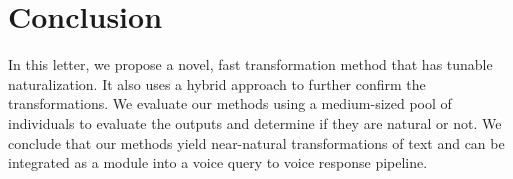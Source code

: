 \documentclass[journal]{IEEEtran}
\begin{document}
\section{Conclusion}

In this letter, we propose a novel, fast transformation method that has tunable naturalization. It also uses a hybrid approach to further confirm the transformations. We evaluate our methods using a medium-sized pool of individuals to evaluate the outputs and determine if they are natural or not. We conclude that our methods yield near-natural transformations of text and can be integrated as a module into a voice query to voice response pipeline.

\end{document}
